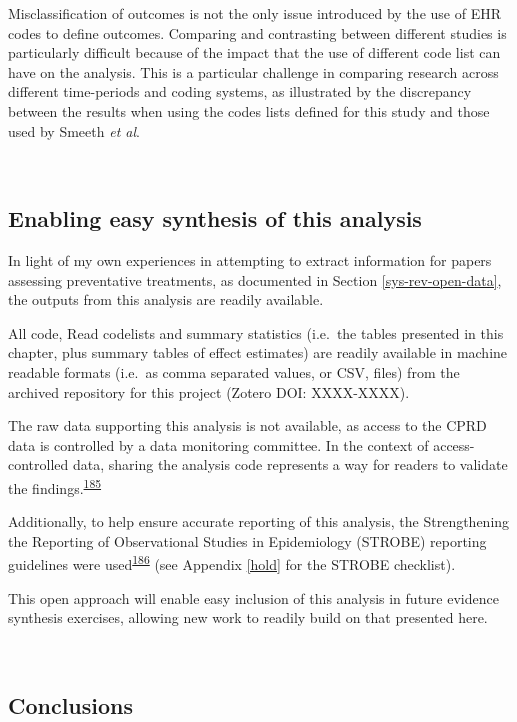 \documentclass[a4paper, twoside]{templates/ociamthesis}
\begin{document}
Misclassification of outcomes is not the only issue introduced by the use of EHR codes to define outcomes. Comparing and contrasting between different studies is particularly difficult because of the impact that the use of different code list can have on the analysis. This is a particular challenge in comparing research across different time-periods and coding systems, as illustrated by the discrepancy between the results when using the codes lists defined for this study and those used by Smeeth \emph{et al}.

~

\hypertarget{cprd-data-avail}{%
\subsection{Enabling easy synthesis of this analysis}\label{cprd-data-avail}}

In light of my own experiences in attempting to extract information for papers assessing preventative treatments, as documented in Section \ref{sys-rev-open-data}, the outputs from this analysis are readily available.

All code, Read codelists and summary statistics (i.e.~the tables presented in this chapter, plus summary tables of effect estimates) are readily available in machine readable formats (i.e.~as comma separated values, or CSV, files) from the archived repository for this project (Zotero DOI: XXXX-XXXX).

The raw data supporting this analysis is not available, as access to the CPRD data is controlled by a data monitoring committee. In the context of access-controlled data, sharing the analysis code represents a way for readers to validate the findings.\textsuperscript{\protect\hyperlink{ref-goldacre2019c}{185}}

Additionally, to help ensure accurate reporting of this analysis, the Strengthening the Reporting of Observational Studies in Epidemiology (STROBE) reporting guidelines were used\textsuperscript{\protect\hyperlink{ref-vandenbroucke2007}{186}} (see Appendix \ref{hold} for the STROBE checklist).

This open approach will enable easy inclusion of this analysis in future evidence synthesis exercises, allowing new work to readily build on that presented here.

~

\hypertarget{conclusions-1}{%
\subsection{Conclusions}\label{conclusions-1}}
\end{document}
